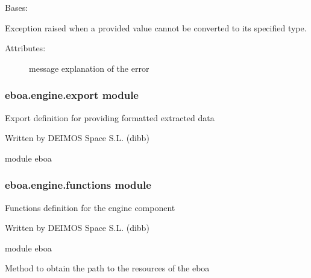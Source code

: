 
\begin{fulllineitems}
\label{\detokenize{eboa.engine:eboa.engine.errors.WrongValue}}
Bases: {\hyperref[\detokenize{eboa.engine:eboa.engine.errors.Error}]{}}

Exception raised when a provided value cannot be converted to its specified type.
\begin{description}
\item[{Attributes:}] \leavevmode
message \textendash{} explanation of the error

\end{description}

\end{fulllineitems}



\subsubsection{eboa.engine.export module}
\label{\detokenize{eboa.engine:module-eboa.engine.export}}\label{\detokenize{eboa.engine:eboa-engine-export-module}}
Export definition for providing formatted extracted data

Written by DEIMOS Space S.L. (dibb)

module eboa


\subsubsection{eboa.engine.functions module}
\label{\detokenize{eboa.engine:module-eboa.engine.functions}}\label{\detokenize{eboa.engine:eboa-engine-functions-module}}
Functions definition for the engine component

Written by DEIMOS Space S.L. (dibb)

module eboa

\begin{fulllineitems}
\label{\detokenize{eboa.engine:eboa.engine.functions.get_resources_path}}
Method to obtain the path to the resources of the eboa

\end{fulllineitems}

